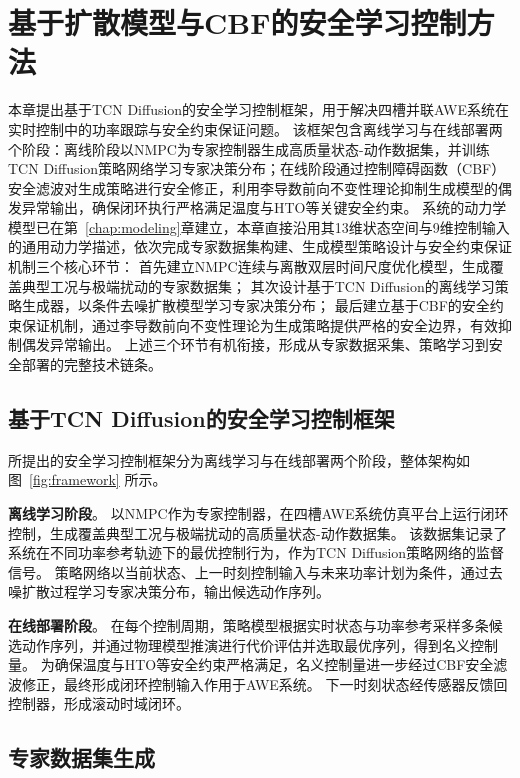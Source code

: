 
\chapter{基于扩散模型与CBF的安全学习控制方法}

本章提出基于TCN Diffusion的安全学习控制框架，用于解决四槽并联AWE系统在实时控制中的功率跟踪与安全约束保证问题。
该框架包含离线学习与在线部署两个阶段：离线阶段以NMPC为专家控制器生成高质量状态-动作数据集，并训练TCN Diffusion策略网络学习专家决策分布；在线阶段通过控制障碍函数（CBF）安全滤波对生成策略进行安全修正，利用李导数前向不变性理论抑制生成模型的偶发异常输出，确保闭环执行严格满足温度与HTO等关键安全约束。
系统的动力学模型已在第~\ref{chap:modeling}章建立，本章直接沿用其13维状态空间与9维控制输入的通用动力学描述，依次完成专家数据集构建、生成模型策略设计与安全约束保证机制三个核心环节：
首先建立NMPC连续与离散双层时间尺度优化模型，生成覆盖典型工况与极端扰动的专家数据集；
其次设计基于TCN Diffusion的离线学习策略生成器，以条件去噪扩散模型学习专家决策分布；
最后建立基于CBF的安全约束保证机制，通过李导数前向不变性理论为生成策略提供严格的安全边界，有效抑制偶发异常输出。
上述三个环节有机衔接，形成从专家数据采集、策略学习到安全部署的完整技术链条。
\section{基于TCN Diffusion的安全学习控制框架}

所提出的安全学习控制框架分为离线学习与在线部署两个阶段，整体架构如图~\ref{fig:framework} 所示。

\textbf{离线学习阶段}。
以NMPC作为专家控制器，在四槽AWE系统仿真平台上运行闭环控制，生成覆盖典型工况与极端扰动的高质量状态-动作数据集。
该数据集记录了系统在不同功率参考轨迹下的最优控制行为，作为TCN Diffusion策略网络的监督信号。
策略网络以当前状态、上一时刻控制输入与未来功率计划为条件，通过去噪扩散过程学习专家决策分布，输出候选动作序列。

\textbf{在线部署阶段}。
在每个控制周期，策略模型根据实时状态与功率参考采样多条候选动作序列，并通过物理模型推演进行代价评估并选取最优序列，得到名义控制量。
为确保温度与HTO等安全约束严格满足，名义控制量进一步经过CBF安全滤波修正，最终形成闭环控制输入作用于AWE系统。
下一时刻状态经传感器反馈回控制器，形成滚动时域闭环。

\section{专家数据集生成}

